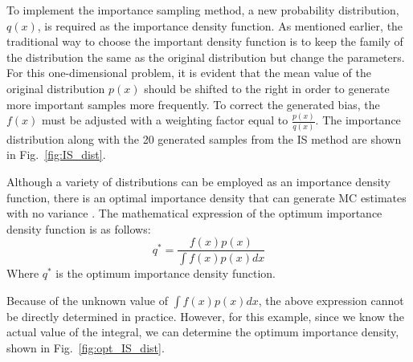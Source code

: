     
    
    

    
    To implement the importance sampling method, a new probability distribution, $q(x)$, is required as the importance density function. As mentioned earlier, the traditional way to choose the important density function is to keep the family of the distribution the same as the original distribution but change the parameters. For this one-dimensional problem, it is evident that the mean value of the original distribution $p(x)$ should be shifted to the right in order to generate more important samples more frequently. To correct the generated bias, the $f(x)$ must be adjusted with a weighting factor equal to $\frac{p(x)}{q(x)}$. The importance distribution along with the 20 generated samples from the IS method are shown in Fig.~\ref{fig:IS_dist}.
    
    
    
    Although a variety of distributions can be employed as an importance density function, there is an optimal importance density that can generate MC estimates with no variance \cite{asmussen_stochastic_2007}. The mathematical expression of the optimum importance density function is as follows:
    $$q^*=\frac{f(x)p(x)}{\int f(x)p(x)dx}$$
    Where $q^{*}$ is the optimum importance density function.
    
    Because of the unknown value of $\int{f(x)}{p(x)}dx$, the above expression cannot be directly determined in practice. However, for this example, since we know the actual value of the integral, we can determine the optimum importance density, shown in Fig.~\ref{fig:opt_IS_dist}.

    

